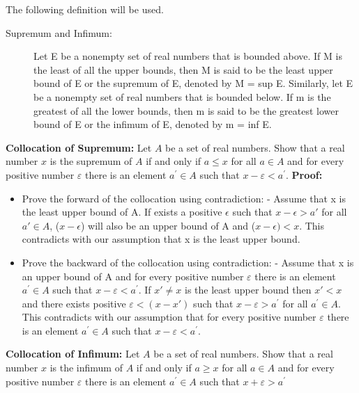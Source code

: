 \begin{numedquestion}
The following definition will be used.    
        \begin{description} 
    \item[Supremum and Infimum:]
Let E be a nonempty set of real numbers that is bounded
above. If M is the least of all the upper bounds, then M is said to be the least upper bound of E or the supremum of E, denoted by M = sup E. Similarly, let E be a nonempty set of real numbers that is bounded below. If m is the greatest of all the lower bounds, then m is said to be the greatest lower bound of E or the infimum of E, denoted by m = inf E.
    \end{description}
  \begin{arabicparts}
    \item \textbf{Collocation of Supremum:} Let \(A\) be a set of real numbers. Show that a real number \(x\) is the supremum of \(A\) if and only if \(a \leq x\) for all \(a \in A\) and for every positive number \(\varepsilon\) there is an element \(a^{\prime} \in A\) such that \(x-\varepsilon<a^{\prime}\). \newline
    \textbf{Proof:}
    \begin{itemize}
        \item Prove the forward of the collocation using contradiction: \newline 
        - Assume that x is the least upper bound of A. If exists a positive \(\epsilon\) such that \( x - \epsilon > a'\) for all \(a' \in A\), (\(x - \epsilon\)) will also be an upper bound of A and (\(x - \epsilon) < x\). This contradicts with our assumption that x is the least upper bound. \newline
        \item Prove the backward of the collocation using contradiction: \newline 
        - Assume that x is an upper bound of A and for every positive number \(\varepsilon\) there is an element \(a^{\prime} \in A\) such that \(x-\varepsilon<a^{\prime}\). If \(x' \neq x\) is the least upper bound then \(x'< x\) and there exists positive \(\varepsilon < (x - x')\) such that \(x-\varepsilon>a^{\prime}\) for all \(a^{\prime} \in A\). This contradicts with our assumption that for every positive number \(\varepsilon\) there is an element \(a^{\prime} \in A\) such that \(x-\varepsilon<a^{\prime}\). 
    \end{itemize} 
    \item \textbf{Collocation of Infimum:} Let \(A\) be a set of real numbers. Show that a real number \(x\) is the infimum of \(A\) if and only if \(a \geq x\) for all \(a \in A\) and for every positive number \(\varepsilon\) there is an element \(a^{\prime} \in A\) such that \(x+\varepsilon>a^{\prime}\)
  \end{arabicparts}
   

\end{numedquestion}
